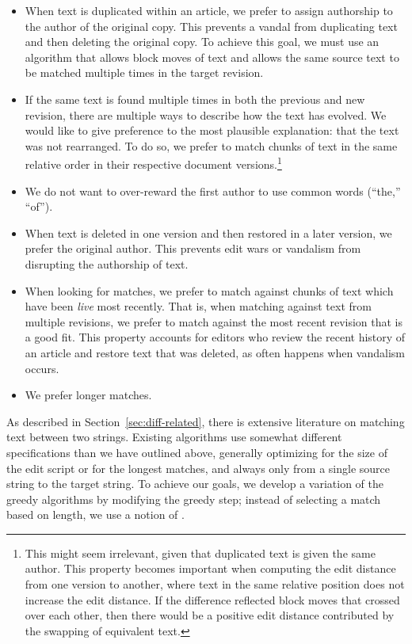 \begin{itemize}
\item When text is duplicated within an article, we prefer to assign
    authorship to the author of the original copy.
    This prevents a vandal from duplicating text and then deleting the
    original copy.
    To achieve this goal, we must use an algorithm that allows
    block moves of text and allows the same source text to be
    matched multiple times in the target revision.
\item If the same text is found multiple times in both the previous
    and new revision, there are multiple ways to describe how the
    text has evolved.
    We would like to give preference to the most plausible explanation:
    that the text was not rearranged.
    To do so, we prefer to match chunks of text in the
    same relative order in their respective document
    versions.\footnote{This might seem irrelevant, given that duplicated
    text is given the same author.  This property becomes important
    when computing the edit distance from one version to another,
    where text in the same relative position does not increase the
    edit distance.  If the difference reflected block moves that
    crossed over each other, then there would be a positive edit
    distance contributed by the swapping of equivalent text.}
\item We do not want to over-reward the first author to use common
    words (\eg ``the,'' ``of'').
\item When text is deleted in one version and then restored in a later
    version, we prefer the original author.
    This prevents edit wars or vandalism from disrupting the
    authorship of text.
\item When looking for matches, we prefer to match against chunks
    of text which have been \textit{live} most recently.
    That is, when matching against text from multiple revisions,
    we prefer to match against the most recent revision that is
    a good fit.
    This property accounts for editors who review the recent history
    of an article and restore text that was deleted, as often happens
    when vandalism occurs.
\item We prefer longer matches.
\end{itemize}


As described in Section~\ref{sec:diff-related}, there is extensive
literature on matching text between two strings.
Existing algorithms use somewhat different specifications than
we have outlined above, generally optimizing for the size of the edit
script or for the longest matches, and always only from a single
source string to the target string.
To achieve our goals, we develop a variation of
the greedy algorithms
by modifying the greedy step; instead of selecting a match
based on length, we use a notion of .

